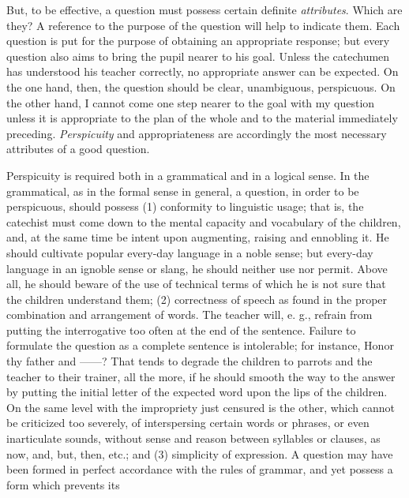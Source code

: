 But, to be effective, a question must possess certain definite \emph{attributes}. Which are they? A reference to the purpose of the question will help to indicate them. Each question is put for the purpose of obtaining an appropriate response; but every question also aims to bring the pupil nearer to his goal.
Unless the catechumen has understood his teacher correctly, no appropriate answer can be expected. On the one hand, then, the question should be clear, unambiguous, perspicuous. On the other hand, I cannot come one step nearer to the goal with my question unless it is appropriate to the plan of the whole and to the material immediately preceding. \emph{Perspicuity} and appropriateness are accordingly the most necessary attributes of a good question.

Perspicuity is required both in a grammatical and in a logical sense. In the grammatical, as in the formal sense in general, a question, in order to be perspicuous, should possess (1) conformity to linguistic usage; that is, the catechist must come down to the mental capacity and vocabulary of the children, and, at the same time be intent upon augmenting, raising and ennobling it. He should cultivate popular every-day language in a noble sense; but every-day language in an ignoble sense or slang, he should neither use nor permit. Above all, he should beware of the use of technical terms of which he is not sure that the children understand them; (2) correctness of speech as found in the proper combination and arrangement of words. The teacher will, e. g., refrain from putting the interrogative too often at the end of the sentence. Failure to formulate the question as a complete sentence is intolerable; for instance, Honor thy father and ——? That tends to degrade the children to parrots and the teacher to their trainer, all the more, if he should smooth the way to the answer by putting the initial letter of the expected word upon the lips of the children. On the same level with the impropriety just censured is the other, which cannot be criticized too severely, of interspersing certain words or phrases, or even inarticulate sounds, without sense and reason between syllables or clauses, as now, and, but, then, etc.; and (3) simplicity of expression. A question may have been formed in perfect accordance with the rules of grammar, and yet possess a form which prevents its
